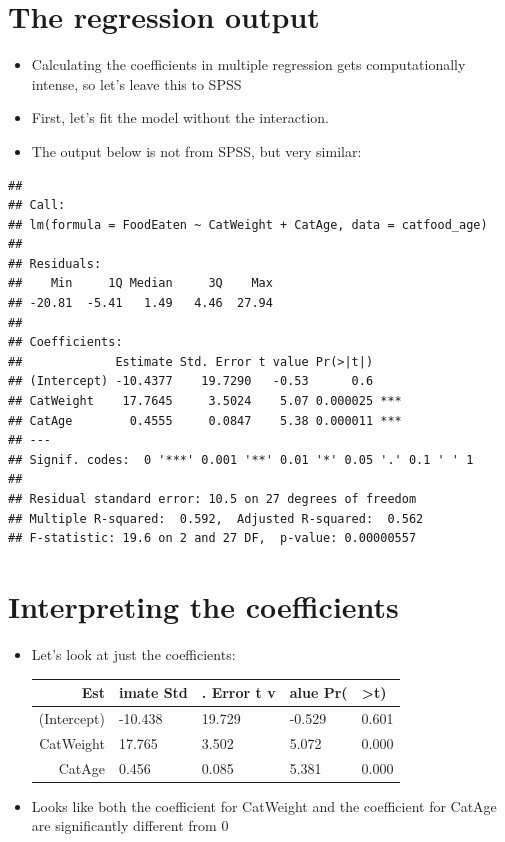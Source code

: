 \documentclass[]{article}
\providecommand{\tightlist}{%
  \setlength{\itemsep}{0pt}\setlength{\parskip}{0pt}}
\begin{document}
\section{The regression output}\label{the-regression-output}

\begin{itemize}
\tightlist
\item
  Calculating the coefficients in multiple regression gets
  computationally intense, so let's leave this to SPSS
\item
  First, let's fit the model without the interaction.
\item
  The output below is not from SPSS, but very similar:
\end{itemize}

\begin{verbatim}
## 
## Call:
## lm(formula = FoodEaten ~ CatWeight + CatAge, data = catfood_age)
## 
## Residuals:
##    Min     1Q Median     3Q    Max 
## -20.81  -5.41   1.49   4.46  27.94 
## 
## Coefficients:
##             Estimate Std. Error t value Pr(>|t|)    
## (Intercept) -10.4377    19.7290   -0.53      0.6    
## CatWeight    17.7645     3.5024    5.07 0.000025 ***
## CatAge        0.4555     0.0847    5.38 0.000011 ***
## ---
## Signif. codes:  0 '***' 0.001 '**' 0.01 '*' 0.05 '.' 0.1 ' ' 1
## 
## Residual standard error: 10.5 on 27 degrees of freedom
## Multiple R-squared:  0.592,  Adjusted R-squared:  0.562 
## F-statistic: 19.6 on 2 and 27 DF,  p-value: 0.00000557
\end{verbatim}

\section{Interpreting the
coefficients}\label{interpreting-the-coefficients}

\begin{itemize}
\item
  Let's look at just the coefficients:

  \begin{longtable}[]{@{}rllll@{}}
  \toprule
  Est & imate Std & . Error t v & alue Pr( &
  \textgreater{}\textbar{}t\textbar{})\tabularnewline
  \midrule
  \endhead
  (Intercept) & -10.438 & 19.729 & -0.529 & 0.601\tabularnewline
  CatWeight & 17.765 & 3.502 & 5.072 & 0.000\tabularnewline
  CatAge & 0.456 & 0.085 & 5.381 & 0.000\tabularnewline
  \bottomrule
  \end{longtable}
\item
  Looks like both the coefficient for CatWeight and the coefficient for
  CatAge are significantly different from 0
\end{itemize}
\end{document}

